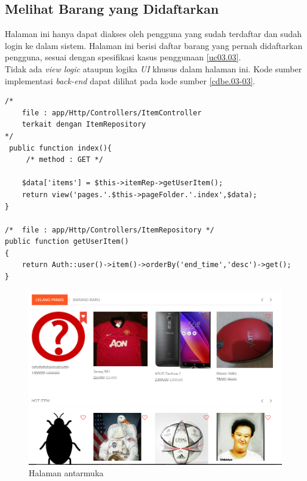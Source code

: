 \subsection{Melihat Barang yang Didaftarkan}
Halaman ini hanya dapat diakses oleh pengguna yang sudah terdaftar dan sudah login ke dalam sistem. Halaman ini berisi daftar barang yang pernah didaftarkan pengguna, sesuai dengan spesifikasi kasus penggunaan \ref{uc03.03}.\\
\indent Tidak ada \textit{view logic} ataupun logika \textit{UI} khusus dalam halaman ini. Kode sumber implementasi \textit{back-end} dapat dilihat pada kode sumber \ref{cdbe.03-03}.

\begin{lstlisting}[label=cdbe.03-03,style=php,caption=Kode Sumber \textit{Back-end} Melihat Barang yang Pernah Didaftarkan]
/*	
	file : app/Http/Controllers/ItemController
	terkait dengan ItemRepository
*/
 public function index(){
	 /*	method : GET */
	
    $data['items'] = $this->itemRep->getUserItem();
    return view('pages.'.$this->pageFolder.'.index',$data);
}

/*	file : app/Http/Controllers/ItemRepository */
public function getUserItem()
{
    return Auth::user()->item()->orderBy('end_time','desc')->get();
}
\end{lstlisting}

\begin{figure}[H]
	\centering
	\includegraphics[width=\textwidth]{images/bab4/ui/02-01.png}
	\caption{Halaman antarmuka }
	\label{ui.02-01}
\end{figure}

